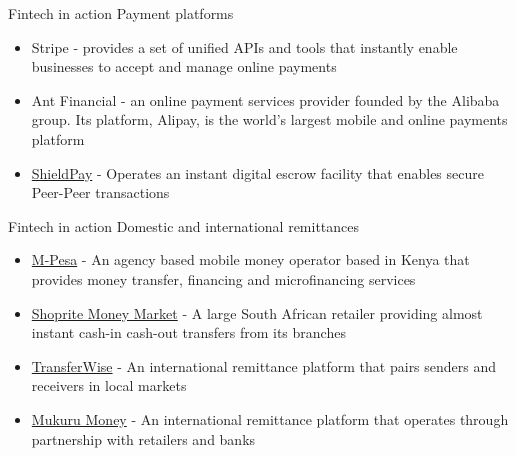 \documentclass[10pt]{beamer}
\begin{document}
\begin{frame}{Fintech in action}
	Payment platforms
	\begin{itemize}
		\item Stripe - provides a set of unified APIs and tools that instantly enable businesses to accept and manage online payments
		\item Ant Financial - an online payment services provider founded by the Alibaba group. Its platform, Alipay, is the world's largest mobile and online payments platform
		\item \href{https://www.shieldpay.com/}{ShieldPay} - Operates an instant digital escrow facility that enables secure Peer-Peer transactions
	\end{itemize}
\end{frame}


\begin{frame}{Fintech in action}
	Domestic and international remittances
	\begin{itemize}
		\item \href{https://www.safaricom.co.ke/personal/m-pesa}{M-Pesa} - An agency based mobile money operator based in Kenya that provides money transfer, financing and microfinancing services
		\item \href{https://www.shoprite.co.za/money-market/money-transfers.html}{Shoprite Money Market} - A large South African retailer providing almost instant cash-in cash-out transfers from its branches
		\item \href{https://transferwise.com/}{TransferWise} - An international remittance platform that pairs senders and receivers in local markets
		\item \href{http://sa.mukuru.com}{Mukuru Money} - An international remittance platform that operates through partnership with retailers and banks
	\end{itemize}
\end{frame}

\end{document}
